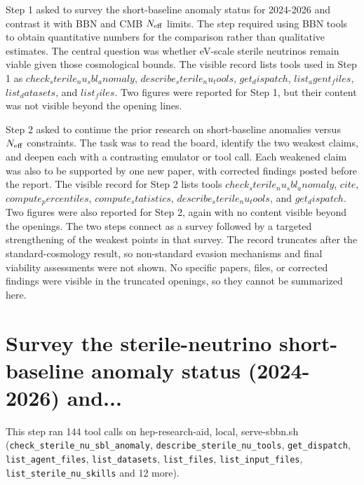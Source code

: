 \documentclass[11pt,a4paper]{article}
\begin{document}
Step 1 asked to survey the short-baseline anomaly status for 2024-2026 and contrast it with BBN and CMB $N_{\rm eff}$ limits. The step required using BBN tools to obtain quantitative numbers for the comparison rather than qualitative estimates. The central question was whether eV-scale sterile neutrinos remain viable given those cosmological bounds. The visible record lists tools used in Step 1 as $check_sterile_nu_sbl_anomaly$, $describe_sterile_nu_tools$, $get_dispatch$, $list_agent_files$, $list_datasets$, and $list_files$. Two figures were reported for Step 1, but their content was not visible beyond the opening lines.

Step 2 asked to continue the prior research on short-baseline anomalies versus $N_{\rm eff}$ constraints. The task was to read the board, identify the two weakest claims, and deepen each with a contrasting emulator or tool call. Each weakened claim was also to be supported by one new paper, with corrected findings posted before the report. The visible record for Step 2 lists tools $check_sterile_nu_sbl_anomaly$, $cite$, $compute_percentiles$, $compute_statistics$, $describe_sterile_nu_tools$, and $get_dispatch$. Two figures were also reported for Step 2, again with no content visible beyond the openings. The two steps connect as a survey followed by a targeted strengthening of the weakest points in that survey. The record truncates after the standard-cosmology result, so non-standard evasion mechanisms and final viability assessments were not shown. No specific papers, files, or corrected findings were visible in the truncated openings, so they cannot be summarized here.

\section{Survey the sterile-neutrino short-baseline anomaly status (2024-2026) and...}
This step ran 144 tool calls on hep-research-aid, local, serve-sbbn.sh (\texttt{check\_sterile\_nu\_sbl\_anomaly}, \texttt{describe\_sterile\_nu\_tools}, \texttt{get\_dispatch}, \texttt{list\_agent\_files}, \texttt{list\_datasets}, \texttt{list\_files}, \texttt{list\_input\_files}, \texttt{list\_sterile\_nu\_skills} and 12 more).\par
\end{document}
